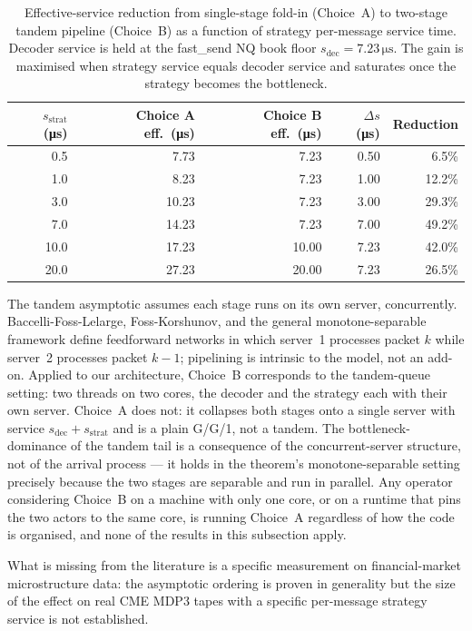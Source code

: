 \documentclass[11pt]{article}
\begin{document}
\begin{table}[htbp]
\centering
\caption{Effective-service reduction from single-stage fold-in (Choice~A) to two-stage tandem pipeline (Choice~B) as a function of strategy per-message service time. Decoder service is held at the fast\_send NQ book floor $s_{\mathrm{dec}} = 7.23\,\si{\micro\second}$. The gain is maximised when strategy service equals decoder service and saturates once the strategy becomes the bottleneck.}
\label{tab:pipeline-gain}
\begin{tabular}{@{}r r r r r@{}}
\toprule
$s_{\mathrm{strat}}$ (\si{\micro\second}) & Choice A eff.\ (\si{\micro\second}) & Choice B eff.\ (\si{\micro\second}) & $\Delta s$ (\si{\micro\second}) & Reduction \\
\midrule
0.5  & 7.73  & 7.23  & 0.50  & 6.5\% \\
1.0  & 8.23  & 7.23  & 1.00  & 12.2\% \\
3.0  & 10.23 & 7.23  & 3.00  & 29.3\% \\
7.0  & 14.23 & 7.23  & 7.00  & 49.2\% \\
10.0 & 17.23 & 10.00 & 7.23  & 42.0\% \\
20.0 & 27.23 & 20.00 & 7.23  & 26.5\% \\
\bottomrule
\end{tabular}
\end{table}

The tandem asymptotic assumes each stage runs on its own server, concurrently. Baccelli-Foss-Lelarge, Foss-Korshunov, and the general monotone-separable framework define feedforward networks in which server~1 processes packet $k$ while server~2 processes packet $k{-}1$; pipelining is intrinsic to the model, not an add-on. Applied to our architecture, Choice~B corresponds to the tandem-queue setting: two threads on two cores, the decoder and the strategy each with their own server. Choice~A does not: it collapses both stages onto a single server with service $s_{\mathrm{dec}} + s_{\mathrm{strat}}$ and is a plain G/G/1, not a tandem. The bottleneck-dominance of the tandem tail is a consequence of the concurrent-server structure, not of the arrival process --- it holds in the theorem's monotone-separable setting precisely because the two stages are separable and run in parallel. Any operator considering Choice~B on a machine with only one core, or on a runtime that pins the two actors to the same core, is running Choice~A regardless of how the code is organised, and none of the results in this subsection apply.

What is missing from the literature is a specific measurement on financial-market microstructure data: the asymptotic ordering is proven in generality but the size of the effect on real CME MDP3 tapes with a specific per-message strategy service is not established.
\end{document}
